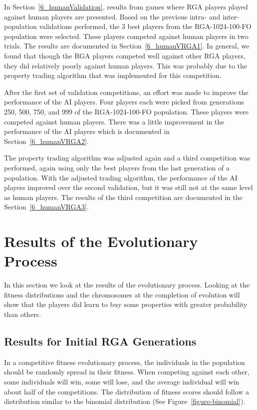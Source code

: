 In Section~\ref{6_humanValidation}, results from games where RGA players played
against human players are presented. Based on the previous intra- and
inter-population validations performed, the 3 best players from the
RGA-1024-100-FO population were selected. These players competed against human
players in two trials. The results are documented in Section~\ref{6_humanVRGA1}.
In general, we found that though the RGA players competed well against other RGA
players, they did relatively poorly against human players. This was probably
due to the property trading algorithm that was implemented for this competition.

After the first set of validation competitions, an effort was made to improve
the performance of the AI players. Four players each were picked from
generations 250, 500, 750, and 999 of the RGA-1024-100-FO population. These
players were competed against human players. There was a little improvement in
the performance of the AI players which is documented in
Section~\ref{6_humanVRGA2}.

The property trading algorithm was adjusted again and a third competition was
performed, again using only the best players from the last generation of a
population. With the adjusted trading algorithm, the performance of the AI
players improved over the second validation, but it was still not at the same
level as human players. The results of the third competition are documented in
the Section~\ref{6_humanVRGA3}.

\section{Results of the Evolutionary Process}\label{6_evoresults}

In this section we look at the results of the evolutionary process. Looking at
the fitness distributions and the chromosomes at the completion of evolution
will show that the players did learn to buy some properties with greater
probability than others.

\subsection{Results for Initial RGA Generations}

In a competitive fitness evolutionary process, the individuals in the population
should be randomly spread in their fitness. When competing against each other,
some individuals will win, some will lose, and the average individual will win
about half of the competitions. The distribution of fitness scores should follow
a distribution similar to the binomial distribution (See
Figure~\ref{figure-binomial}).

